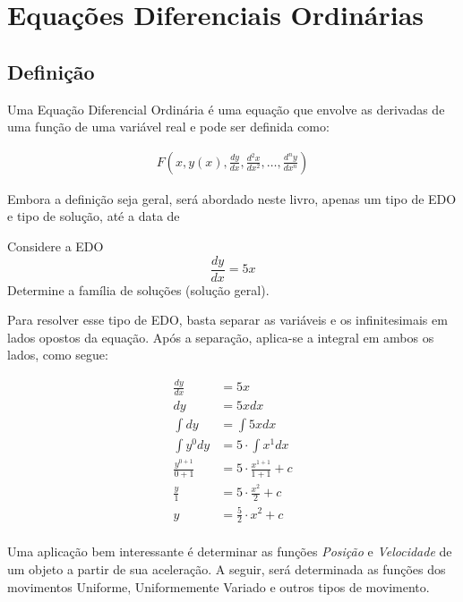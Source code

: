 
\chapter{Equações Diferenciais Ordinárias}
\section{Definição}
Uma Equação Diferencial Ordinária é uma equação que envolve as derivadas de uma função de uma variável real e pode ser definida como:

\begin{ceqn}
    \begin{align*}
        F \left (x, y(x), \frac{dy}{dx}, \frac{d^2 x}{dx^2}, \ldots , \frac{d^{n}y}{dx^{n}} \right )
    \end{align*}
\end{ceqn}

Embora a definição seja geral, será abordado neste livro, apenas um tipo de EDO e tipo de solução, até a data de \date .

\begin{example}
    Considere a EDO $$\frac{dy}{dx} = 5x$$ 
    Determine a família de soluções (solução geral).

\solucao{}
Para resolver esse tipo de EDO, basta separar as variáveis e os infinitesimais em lados opostos da equação. Após a separação, aplica-se a integral em ambos os lados, como segue:
    \begin{ceqn}
        \begin{align*}
            \frac{dy}{dx} &= 5x \\
            dy &= 5x dx \\
            \int dy &= \int 5x dx \\
            \int y^0 dy &= 5 \cdot \int x^1 dx \\
            \frac{y^{0+1}}{0+1} &= 5 \cdot \frac{x^{1+1}}{1+1} + c \\
            \frac{y}{1} &= 5 \cdot \frac{x^2}{2} + c \\
            y &= \frac{5}{2} \cdot x^2 + c \\
        \end{align*}
    \end{ceqn}
\end{example}


Uma aplicação bem interessante é determinar as funções \textit{Posição} e \textit{Velocidade} de um objeto a partir de sua aceleração. A seguir, será determinada as funções dos movimentos Uniforme, Uniformemente Variado e outros tipos de movimento.

